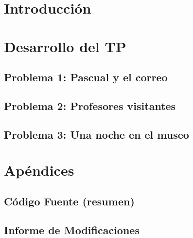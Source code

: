 \documentclass[11pt, a4paper, twoside]{article}
\begin{document}
{}
\newpage{\pagestyle{empty}\cleardoublepage}
\setcounter{page}{1}

\newpage{\pagestyle{empty}\tableofcontents\cleardoublepage}

\begin{TP1}
\section{Introducción}

\newpage

\section{Desarrollo del TP}
	
	\subsection{Problema 1: Pascual y el correo}
	
	\newpage
	
	\subsection{Problema 2: Profesores visitantes}
	
	\newpage
	
	\subsection{Problema 3: Una noche en el museo}
	
	\newpage

\section{Apéndices}
	
	\subsection{Código Fuente (resumen)}
	
	\clearpage
	
	\subsection{Informe de Modificaciones}
	
	\clearpage
	

\end{TP1}
\end{document}

